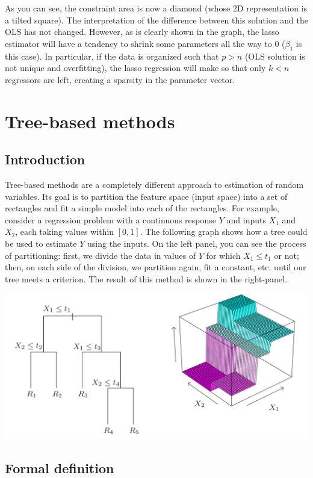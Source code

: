 \documentclass[12pt]{report}
\begin{document}
As you can see, the constraint area is now a diamond (whose 2D representation is a tilted square). The interpretation of the difference between this solution and the OLS has not changed. However, as is clearly shown in the graph, the lasso estimator will have a tendency to shrink some parameters all the way to 0 ($\beta_1$ is this case). In particular, if the data is organized such that $p>n$ (OLS solution is not unique and overfitting), the lasso regression will make so that only $k<n$ regressors are left, creating a sparsity in the parameter vector.

\section{Tree-based methods}

\subsection{Introduction}

Tree-based methods are a completely different approach to estimation of random variables. Its goal is to partition the feature space (input space) into a set of rectangles and fit a simple model into each of the rectangles. For example, consider a regression problem with a continuous response $Y$ and inputs $X_1$ and $X_2$, each taking values within $[0,1]$. The following graph shows how a tree could be used to estimate $Y$ using the inputs. On the left panel, you can see the process of partitioning: first, we divide the data in values of $Y$ for which $X_1 \leq t_1$ or not; then, on each side of the division, we partition again, fit a constant, etc. until our tree meets a criterion. The result of this method is shown in the right-panel.

\includegraphics[scale=0.4]{images/tbmethod.png}

\subsection{Formal definition}
\end{document}
